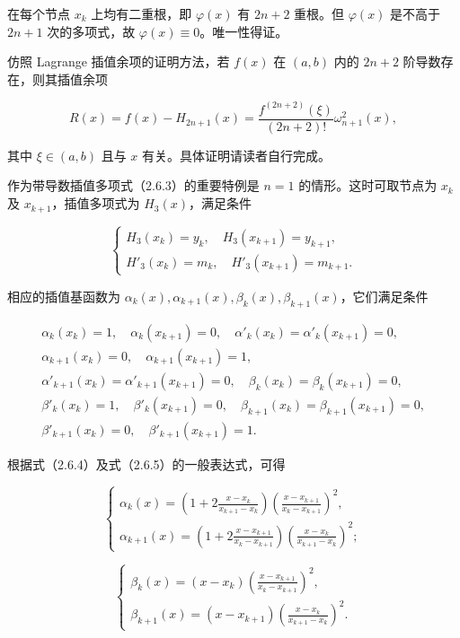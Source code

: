 \documentclass[
  10pt,
  fontset=fandol]{ctexart}
\begin{document}
在每个节点 \(x_k\) 上均有二重根，即 \(\varphi(x)\) 有 \(2n+2\) 重根。但 \(\varphi(x)\) 是不高于 \(2n+1\) 次的多项式，故 \(\varphi(x)\equiv0\)。唯一性得证。

仿照 Lagrange 插值余项的证明方法，若 \(f(x)\) 在 \((a,b)\) 内的 \(2n+2\) 阶导数存在，则其插值余项

\[R(x)=f(x)-H_{2n+1}(x)=\frac{f^{(2n+2)}(\xi)}{(2n+2)!}\omega_{n+1}^2(x),\tag{2.6.6}\]

其中 \(\xi\in(a,b)\) 且与 \(x\) 有关。具体证明请读者自行完成。

作为带导数插值多项式（2.6.3）的重要特例是 \(n=1\) 的情形。这时可取节点为 \(x_k\) 及 \(x_{k+1}\)，插值多项式为 \(H_3(x)\)，满足条件

\[\begin{cases}
H_3(x_k)=y_k,\quad H_3(x_{k+1})=y_{k+1},\\
H'_3(x_k)=m_k,\quad H'_3(x_{k+1})=m_{k+1}.
\end{cases}\tag{2.6.7}\]

相应的插值基函数为 \(\alpha_k(x),\alpha_{k+1}(x),\beta_k(x),\beta_{k+1}(x)\)，它们满足条件

\[\begin{gathered}
\alpha_k(x_k)=1,\quad\alpha_k(x_{k+1})=0,\quad\alpha'_k(x_k)=\alpha'_k(x_{k+1})=0,\\
\alpha_{k+1}(x_k)=0,\quad\alpha_{k+1}(x_{k+1})=1,\\
\alpha'_{k+1}(x_k)=\alpha'_{k+1}(x_{k+1})=0,\quad\beta_k(x_k)=\beta_k(x_{k+1})=0,\\
\beta'_k(x_k)=1,\quad\beta'_k(x_{k+1})=0,\quad\beta_{k+1}(x_k)=\beta_{k+1}(x_{k+1})=0,\\
\beta'_{k+1}(x_k)=0,\quad\beta'_{k+1}(x_{k+1})=1.
\end{gathered}\]

根据式（2.6.4）及式（2.6.5）的一般表达式，可得

\[\begin{cases}
\displaystyle\alpha_k(x)=\left(1+2\frac{x-x_k}{x_{k+1}-x_k}\right)\left(\frac{x-x_{k+1}}{x_k-x_{k+1}}\right)^2,\\[6pt]
\displaystyle\alpha_{k+1}(x)=\left(1+2\frac{x-x_{k+1}}{x_k-x_{k+1}}\right)\left(\frac{x-x_k}{x_{k+1}-x_k}\right)^2;
\end{cases}\tag{2.6.8}\]

\[\begin{cases}
\displaystyle\beta_k(x)=(x-x_k)\left(\frac{x-x_{k+1}}{x_k-x_{k+1}}\right)^2,\\[6pt]
\displaystyle\beta_{k+1}(x)=(x-x_{k+1})\left(\frac{x-x_k}{x_{k+1}-x_k}\right)^2.
\end{cases}\tag{2.6.9}\]
\end{document}
